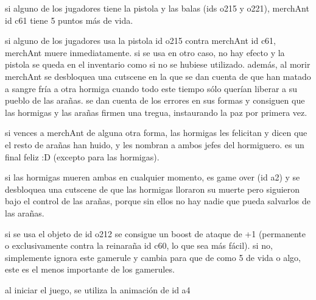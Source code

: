\begin{DoxyItemize}
\item si alguno de los jugadores tiene la pistola y las balas (ids o215 y o221), merch\+Ant id c61 tiene 5 puntos más de vida.
\item si alguno de los jugadores usa la pistola id o215 contra merch\+Ant id c61, merch\+Ant muere inmediatamente. si se usa en otro caso, no hay efecto y la pistola se queda en el inventario como si no se hubiese utilizado. además, al morir merch\+Ant se desbloquea una cutscene en la que se dan cuenta de que han matado a sangre fría a otra hormiga cuando todo este tiempo sólo querían liberar a su pueblo de las arañas. se dan cuenta de los errores en sus formas y consiguen que las hormigas y las arañas firmen una tregua, instaurando la paz por primera vez.
\item si vences a merch\+Ant de alguna otra forma, las hormigas les felicitan y dicen que el resto de arañas han huido, y les nombran a ambos jefes del hormiguero. es un final feliz \+:D (excepto para las hormigas).
\item si las hormigas mueren ambas en cualquier momento, es game over (id a2) y se desbloquea una cutscene de que las hormigas lloraron su muerte pero siguieron bajo el control de las arañas, porque sin ellos no hay nadie que pueda salvarlos de las arañas.
\item si se usa el objeto de id o212 se consigue un boost de ataque de +1 (permanente o exclusivamente contra la reinaraña id c60, lo que sea más fácil). si no, simplemente ignora este gamerule y cambia para que de como 5 de vida o algo, este es el menos importante de los gamerules.
\item al iniciar el juego, se utiliza la animación de id a4 
\end{DoxyItemize}